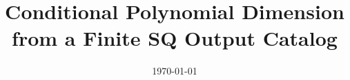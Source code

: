 \documentclass[11pt, letterpaper]{article}
\title{\LARGE Conditional Polynomial Dimension from a Finite SQ Output Catalog}
\author{}
\date{\small{\today}}
\newif\ifusebibliography
\begin{document}
\maketitle






\ifusebibliography
\newpage


\fi

\newpage

\end{document}
